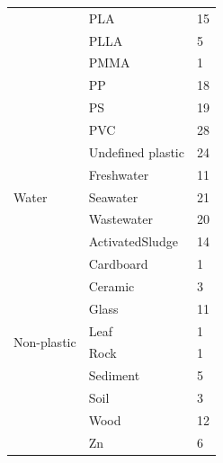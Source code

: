 \begin{table}[H]
\begin{tabular}{@{}lll@{}}
                              & PLA                & 15         \\
                              & PLLA               & 5          \\
                              & PMMA               & 1          \\
                              & PP                 & 18         \\
                              & PS                 & 19         \\
                              & PVC                & 28         \\
                              & Undefined plastic  & 24         \\ \midrule
\multirow{3}{*}{Water}        & Freshwater         & 11         \\
                              & Seawater           & 21         \\
                              & Wastewater         & 20         \\  \midrule
\multirow{10}{*}{Non-plastic} & ActivatedSludge    & 14         \\
                              & Cardboard          & 1          \\
                              & Ceramic            & 3          \\
                              & Glass              & 11         \\
                              & Leaf               & 1          \\
                              & Rock               & 1          \\
                              & Sediment           & 5          \\
                              & Soil               & 3          \\
                              & Wood               & 12         \\
                              & Zn                 & 6          \\ \bottomrule
\end{tabular}
\end{table}

